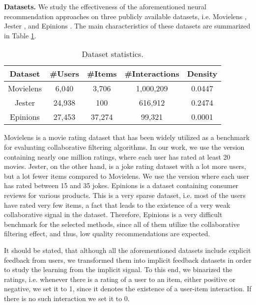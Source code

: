 \textbf{Datasets.}
We study the effectiveness of the aforementioned neural recommendation approaches on three publicly available datasets, i.e. Movielens \cite{harper2016movielens}, Jester \cite{jester}, and Epinions \cite{epinions}. 
The main characteristics of these datasets are summarized in Table \ref{tab:datasets}.

\begin{table}[h]
    \centering
    \begin{tabular}{c|c|c|c|c}
        \hline
        Dataset & \#Users & \#Items & \#Interactions & Density \\
        \hline
        Movielens &  6,040 &  3,706 & 1,000,209 & 0.0447 \\
        Jester    & 24,938 &    100 &   616,912 & 0.2474 \\
        Epinions  & 27,453 & 37,274 &    99,321 & 0.0001
    \end{tabular}
    \caption{Dataset statistics.}
    \label{tab:datasets}
\end{table}

Movielens is a movie rating dataset that has been widely utilized as a benchmark for evaluating collaborative filtering algorithms.
In our work, we use the version containing nearly one million ratings, where each user has rated at least 20 movies.
Jester, on the other hand, is a joke rating dataset with a lot more users, but a lot fewer items compared to Movielens.
We use the version where each user has rated between 15 and 35 jokes.
Epinions is a dataset containing consumer reviews for various products. 
This is a very sparse dataset, i.e. most of the users have rated very few items, a fact that leads to the existence of a very weak collaborative signal in the dataset. 
Therefore, Epinions is a very difficult benchmark for the selected methods, since all of them utilize the collaborative filtering effect, and thus, low quality recommendations are expected.

It should be stated, that although all the aforementioned datasets include explicit feedback from users, we transformed them into implicit feedback datasets in order to study the learning from the implicit signal.
To this end, we binarized the ratings, i.e. whenever there is a rating of a user to an item, either positive or negative, we set it to 1, since it denotes the existence of a user-item interaction. 
If there is no such interaction we set it to 0.

